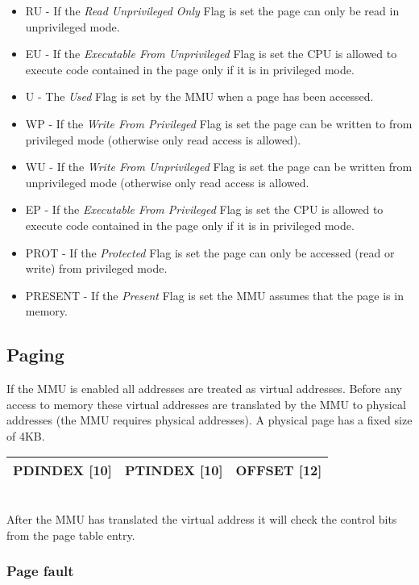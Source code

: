 \begin{itemize}
  \item RU - If the \emph{Read Unprivileged Only} Flag is set the page can only be read in unprivileged mode. 
  \item EU - If the \emph{Executable From Unprivileged} Flag is set the CPU is allowed to execute code contained in the page only if it is in privileged mode.
  \item U - The \emph{Used} Flag is set by the MMU when a page has been accessed.
  \item WP - If the \emph{Write From Privileged} Flag is set the page can be written to from privileged mode (otherwise only read access is allowed).
  \item WU - If the \emph{Write From Unprivileged} Flag is set the page can be written from unprivileged mode (otherwise only read access is allowed.
  \item EP - If the \emph{Executable From Privileged} Flag is set the CPU is allowed to execute code contained in the page only if it is in privileged mode.
  \item PROT - If the \emph{Protected} Flag is set the page can only be accessed (read or write) from privileged mode.
  \item PRESENT - If the \emph{Present} Flag is set the MMU assumes that the page is in memory. 
\end{itemize}

\subsection{Paging}

If the MMU is enabled all addresses are treated as virtual addresses. Before any access to memory these virtual addresses are translated by the MMU
to physical addresses (the MMU requires physical addresses). A physical page has a fixed size of 4KB. 


\begin{tabular}{ | r | r | r | }
	\hline
	PDINDEX [10] & PTINDEX [10] & OFFSET [12] \\
	\hline
\end{tabular} \\

After the MMU has translated the virtual address it will check the control bits from the page table entry. 

\subsubsection{Page fault}

